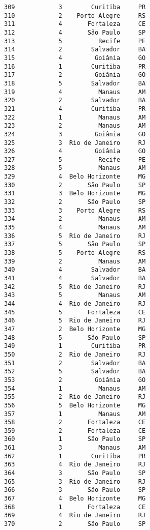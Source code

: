 \documentclass[11pt]{article}
\begin{document}
\begin{Verbatim}[commandchars=\\\{\}]
309            3        Curitiba     PR  
310            2    Porto Alegre     RS  
311            4       Fortaleza     CE  
312            4       São Paulo     SP  
313            5          Recife     PE  
314            2        Salvador     BA  
315            4         Goiânia     GO  
316            1        Curitiba     PR  
317            2         Goiânia     GO  
318            5        Salvador     BA  
319            4          Manaus     AM  
320            2        Salvador     BA  
321            4        Curitiba     PR  
322            1          Manaus     AM  
323            2          Manaus     AM  
324            3         Goiânia     GO  
325            3  Rio de Janeiro     RJ  
326            4         Goiânia     GO  
327            5          Recife     PE  
328            5          Manaus     AM  
329            4  Belo Horizonte     MG  
330            2       São Paulo     SP  
331            3  Belo Horizonte     MG  
332            2       São Paulo     SP  
333            3    Porto Alegre     RS  
334            2          Manaus     AM  
335            4          Manaus     AM  
336            5  Rio de Janeiro     RJ  
337            5       São Paulo     SP  
338            5    Porto Alegre     RS  
339            2          Manaus     AM  
340            4        Salvador     BA  
341            4        Salvador     BA  
342            5  Rio de Janeiro     RJ  
343            5          Manaus     AM  
344            4  Rio de Janeiro     RJ  
345            5       Fortaleza     CE  
346            5  Rio de Janeiro     RJ  
347            2  Belo Horizonte     MG  
348            5       São Paulo     SP  
349            1        Curitiba     PR  
350            2  Rio de Janeiro     RJ  
351            2        Salvador     BA  
352            5        Salvador     BA  
353            2         Goiânia     GO  
354            1          Manaus     AM  
355            2  Rio de Janeiro     RJ  
356            5  Belo Horizonte     MG  
357            1          Manaus     AM  
358            2       Fortaleza     CE  
359            2       Fortaleza     CE  
360            1       São Paulo     SP  
361            3          Manaus     AM  
362            1        Curitiba     PR  
363            4  Rio de Janeiro     RJ  
364            3       São Paulo     SP  
365            3  Rio de Janeiro     RJ  
366            3       São Paulo     SP  
367            4  Belo Horizonte     MG  
368            1       Fortaleza     CE  
369            4  Rio de Janeiro     RJ  
370            2       São Paulo     SP  

\end{Verbatim}
\end{document}

